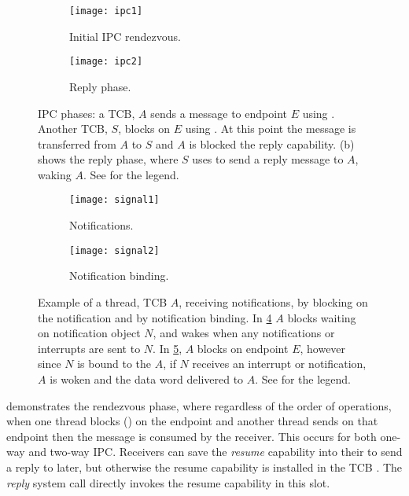 \begin{figure}
    \centering
    \begin{subfigure}[h]{0.48\textwidth}
        \centering
        \texttt{[image: ipc1]}
        \caption{Initial IPC rendezvous.}
        \label{f:ipc1}
    \end{subfigure}%
    \begin{subfigure}[h]{0.48\textwidth}
        \centering
        \texttt{[image: ipc2]}
        \caption{Reply phase.}
        \label{f:ipc2}
    \end{subfigure}
    \caption[IPC phases.]{IPC phases: a TCB, $A$ sends a message to endpoint $E$ using \call. Another
        TCB, $S$, blocks on $E$ using \recv. At this point the message is transferred from 
        $A$ to $S$ and $A$ is blocked the reply capability. (b) shows the
    reply phase, where $S$ uses \reply to send a reply message to $A$, waking $A$. See  for the legend.}
    \label{f:ipc}
\end{figure}

\begin{figure}
    \centering
    \begin{subfigure}[h]{0.48\textwidth}
        \centering
        \texttt{[image: signal1]}
        \caption{Notifications.} 
        \label{f:signal1}
    \end{subfigure}%
    \begin{subfigure}[h]{0.48\textwidth}
        \centering
        \texttt{[image: signal2]}
        \caption{Notification binding.}
        \label{f:signal2}
    \end{subfigure}
    \caption[Notification illustrations.]{Example of a thread, TCB $A$, receiving notifications, by blocking on the notification and by
        notification binding. In \cref{f:signal1} $A$ blocks waiting on notification
        object $N$, and wakes when any notifications or interrupts are sent to $N$. In
        \cref{f:signal2}, $A$ blocks on endpoint $E$, however since
        $N$ is bound to the $A$, if $N$ receives an interrupt or notification,
        $A$ is woken and the data word delivered to $A$.
        See  for the legend.}
    \label{f:signal}
\end{figure}

 demonstrates the rendezvous phase, where regardless of the order of operations, 
when one thread blocks (\recv) on the endpoint and another thread sends on that endpoint
then the message is consumed by the receiver. This occurs for both one-way and two-way \gls{IPC}.
Receivers can save
the \emph{resume} capability into their \cspace to send a reply to later, but otherwise the resume capability is
installed in the \gls{TCB} \cnode. The \emph{reply} system call directly invokes the resume
capability in this slot. 

